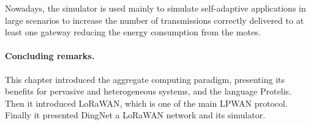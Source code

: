 Nowadays, the simulator is used mainly to simulate self-adaptive applications in large scenarios to increase the number of transmissions correctly delivered to at least one gateway reducing the energy consumption from the motes.

\paragraph{Concluding remarks.} This chapter introduced the aggregate computing paradigm, presenting its benefits for pervasive and heterogeneous systems, and the language Protelis. Then it introduced LoRaWAN, which is one of the main LPWAN protocol. 
Finally it presented DingNet a LoRaWAN network and its simulator.